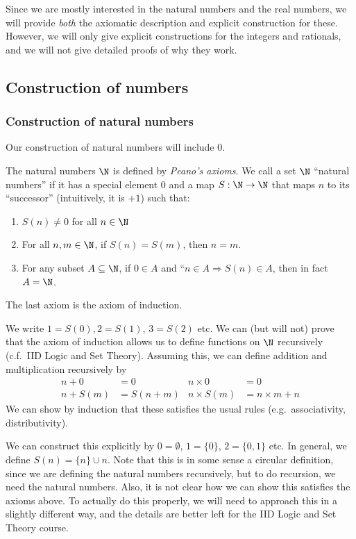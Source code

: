 \documentclass[a4paper]{article}
\begin{document}
Since we are mostly interested in the natural numbers and the real numbers, we will provide \emph{both} the axiomatic description and explicit construction for these. However, we will only give explicit constructions for the integers and rationals, and we will not give detailed proofs of why they work.

\subsection{Construction of numbers}
\subsubsection*{Construction of natural numbers}
Our construction of natural numbers will include $0$.

\begin{defi}
  The natural numbers $\N$ is defined by \emph{Peano's axioms}. We call a set $\N$ ``natural numbers'' if it has a special element $0$ and a map $S: \N \to \N$ that maps $n$ to its ``successor'' (intuitively, it is $+1$) such that:
  \begin{enumerate}
    \item $S(n) \not= 0$ for all $n \in \N$
    \item For all $n, m \in \N$, if $S(n) = S(m)$, then $n = m$.
    \item For any subset $A \subseteq \N$, if $0 \in A$ and ``$n \in A \Rightarrow S(n) \in A$, then in fact $A = \N$.
  \end{enumerate}
  The last axiom is the axiom of induction.

  We write $1 = S(0), 2 = S(1)$, $3 = S(2)$ etc. We can (but will not) prove that the axiom of induction allows us to define functions on $\N$ recursively (c.f.\ IID Logic and Set Theory). Assuming this, we can define addition and multiplication recursively by
  \begin{align*}
    n + 0 &= 0 &n\times 0 &= 0\\
    n + S(m) &= S(n + m) & n \times S(m) &= n \times m + n
  \end{align*}
  We can show by induction that these satisfies the usual rules (e.g.\ associativity, distributivity).
\end{defi}
We can construct this explicitly by $0 = \emptyset$, $1 = \{0\}$, $2 = \{0, 1\}$ etc. In general, we define $S(n) = \{n\} \cup n$. Note that this is in some sense a circular definition, since we are defining the natural numbers recursively, but to do recursion, we need the natural numbers. Also, it is not clear how we can show this satisfies the axioms above. To actually do this properly, we will need to approach this in a slightly different way, and the details are better left for the IID Logic and Set Theory course.
\end{document}
